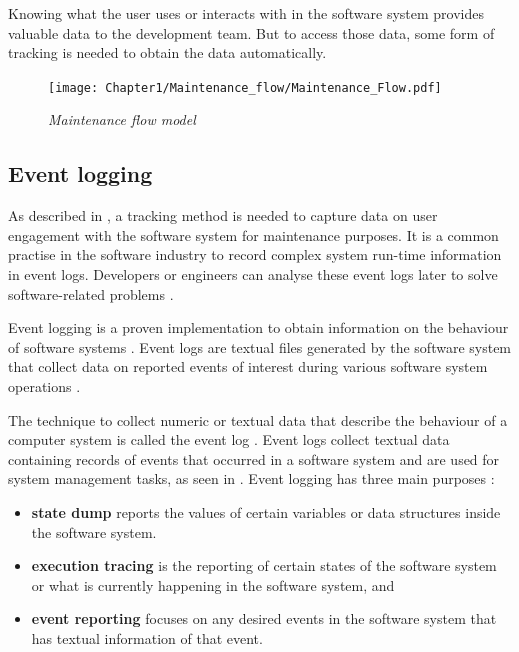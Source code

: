 \clearpage

Knowing what the user uses or interacts with in the software system provides valuable data to the development team. But to access those data, some form of tracking is needed to obtain the data automatically.

\begin{figure}[!htb]
	\centering %
	\texttt{[image: Chapter1/Maintenance\_flow/Maintenance\_Flow.pdf]}
	\caption[Maintenance flow model]
	{\textit{Maintenance flow model \cite{Tang2010}}} \label{fig:ch1_maintenanceFlow}
\end{figure}

\clearpage

\subsection{Event logging}\label{sec:ch1_eventLogging}
As described in , a tracking method is needed to capture data on user engagement with the software system for maintenance purposes. It is a common practise in the software industry to record complex system run-time information in event logs. Developers or engineers can analyse these event logs later to solve software-related problems \cite{Zhu2019}. \par Event logging is a proven implementation to obtain information on the behaviour of software systems \cite{Baccanico2014}. Event logs are textual files generated by the software system that collect data on reported events of interest during various software system operations \cite{Cinque2013, Baccanico2014}.\par The technique to collect numeric or textual data that describe the behaviour of a computer system is called the event log \cite{Pecchia2015, Baccanico2014}. Event logs collect textual data containing records of events that occurred in a software system and are used for system management tasks, as seen in  \cite{Rong2018a, Rong2018, Baccanico2014}. Event logging has three main purposes \cite{Pecchia2015, Baccanico2014}:

\begin{itemize}
	\item \textbf{state dump} reports the values of certain variables or data structures inside the software system.
	\item \textbf{execution tracing} is the reporting of certain states of the software system or what is currently happening in the software system, and
	\item \textbf{event reporting} focuses on any desired events in the software system that has textual information of that event.
\end{itemize}

